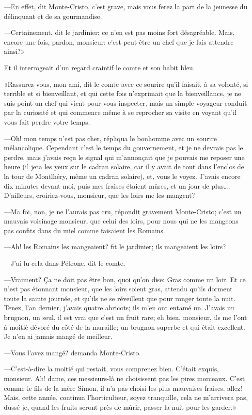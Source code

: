 —En effet, dit Monte-Cristo, c'est grave, mais vous ferez la part de la jeunesse du délinquant et de sa gourmandise. 

—Certainement, dit le jardinier; ce n'en est pas moins fort désagréable. Mais, encore une fois, pardon, monsieur: c'est peut-être un chef que je fais attendre ainsi?» 

Et il interrogeait d'un regard craintif le comte et son habit bleu. 

«Rassurez-vous, mon ami, dit le comte avec ce sourire qu'il faisait, à sa volonté, si terrible et si bienveillant, et qui cette fois n'exprimait que la bienveillance, je ne suis point un chef qui vient pour vous inspecter, mais un simple voyageur conduit par la curiosité et qui commence même à se reprocher sa visite en voyant qu'il vous fait perdre votre temps. 

—Oh! mon temps n'est pas cher, répliqua le bonhomme avec un sourire mélancolique. Cependant c'est le temps du gouvernement, et je ne devrais pas le perdre, mais j'avais reçu le signal qui m'annonçait que je pouvais me reposer une heure (il jeta les yeux sur le cadran solaire, car il y avait de tout dans l'enclos de la tour de Montlhéry, même un cadran solaire), et, vous le voyez. J'avais encore dix minutes devant moi, puis mes fraises étaient mûres, et un jour de plus\dots. D'ailleurs, croiriez-vous, monsieur, que les loirs me les mangent? 

—Ma foi, non, je ne l'aurais pas cru, répondit gravement Monte-Cristo; c'est un mauvais voisinage monsieur, que celui des loirs, pour nous qui ne les mangeons pas confits dans du miel comme faisaient les Romains. 

—Ah! les Romains les mangeaient? fit le jardinier; ils mangeaient les loirs? 

—J'ai lu cela dans Pétrone, dit le comte. 

—Vraiment? Ça ne doit pas être bon, quoi qu'on dise: Gras comme un loir. Et ce n'est pas étonnant monsieur, que les loirs soient gras, attendu qu'ils dorment toute la sainte journée, et qu'ils ne se réveillent que pour ronger toute la nuit. Tenez, l'an dernier, j'avais quatre abricots; ils m'en ont entamé un. J'avais un brugnon, un seul, il est vrai que c'est un fruit rare; eh bien, monsieur, ils me l'ont à moitié dévoré du côté de la muraille; un brugnon superbe et qui était excellent. Je n'en ai jamais mangé de meilleur. 

—Vous l'avez mangé? demanda Monte-Cristo. 

—C'est-à-dire la moitié qui restait, vous comprenez bien. C'était exquis, monsieur. Ah! dame, ces messieurs-là ne choisissent pas les pires morceaux. C'est comme le fils de la mère Simon, il n'a pas choisi les plus mauvaises fraises, allez! Mais, cette année, continua l'horticulteur, soyez tranquille, cela ne m'arrivera pas, dussé-je, quand les fruits seront près de mûrir, passer la nuit pour les garder.» 

